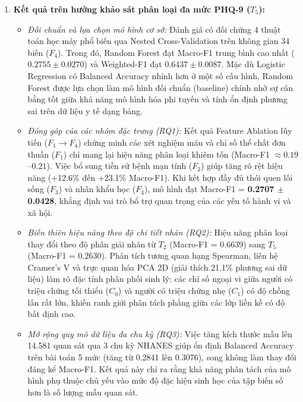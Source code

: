 \begin{enumerate}
    \item \textbf{Kết quả trên hướng khảo sát phân loại đa mức PHQ-9 ($T_5$):}
    \begin{itemize}
        \item \textit{Đối chuẩn và lựa chọn mô hình cơ sở:} Đánh giá có đối chứng 4 thuật toán học máy phổ biến qua Nested Cross-Validation trên không gian 34 biến ($F_4$). Trong đó, Random Forest đạt Macro-F1 trung bình cao nhất ($0.2755 \pm 0.0270$) và Weighted-F1 đạt $0.6437 \pm 0.0087$. Mặc dù Logistic Regression có Balanced Accuracy nhỉnh hơn ở một số cấu hình, Random Forest được lựa chọn làm mô hình đối chuẩn (baseline) chính nhờ sự cân bằng tốt giữa khả năng mô hình hóa phi tuyến và tính ổn định phương sai trên dữ liệu y tế dạng bảng.
        \item \textit{Đóng góp của các nhóm đặc trưng (RQ1):} Kết quả Feature Ablation lũy tiến ($F_1 \to F_4$) chứng minh các xét nghiệm máu và chỉ số thể chất đơn thuần ($F_1$) chỉ mang lại hiệu năng phân loại khiêm tốn (Macro-F1 $\approx 0.19$--$0.21$). Việc bổ sung tiền sử bệnh mạn tính ($F_2$) giúp tăng rõ rệt hiệu năng (+12.6\% đến +23.1\% Macro-F1). Khi kết hợp đầy đủ thói quen lối sống ($F_3$) và nhân khẩu học ($F_4$), mô hình đạt Macro-F1 = \textbf{0.2707 $\pm$ 0.0428}, khẳng định vai trò bổ trợ quan trọng của các yếu tố hành vi và xã hội.
        \item \textit{Biến thiên hiệu năng theo độ chi tiết nhãn (RQ2):} Hiệu năng phân loại thay đổi theo độ phân giải nhãn từ $T_2$ (Macro-F1 = 0.6639) sang $T_5$ (Macro-F1 = 0.2630). Phân tích tương quan hạng Spearman, liên hệ Cramer's V và trực quan hóa PCA 2D (giải thích 21.1\% phương sai dữ liệu) làm rõ đặc tính phân phối sinh lý: các chỉ số ngoại vi giữa người có triệu chứng tối thiểu ($C_0$) và người có triệu chứng nhẹ ($C_1$) có độ chồng lấn rất lớn, khiến ranh giới phân tách phẳng giữa các lớp liền kề có độ bất định cao.
        \item \textit{Mở rộng quy mô dữ liệu đa chu kỳ (RQ3):} Việc tăng kích thước mẫu lên 14.581 quan sát qua 3 chu kỳ NHANES giúp ổn định Balanced Accuracy trên bài toán 5 mức (tăng từ 0.2841 lên 0.3076), song không làm thay đổi đáng kể Macro-F1. Kết quả này chỉ ra rằng khả năng phân tách của mô hình phụ thuộc chủ yếu vào mức độ đặc hiệu sinh học của tập biến số hơn là số lượng mẫu quan sát.
    \end{itemize}


\end{enumerate}
